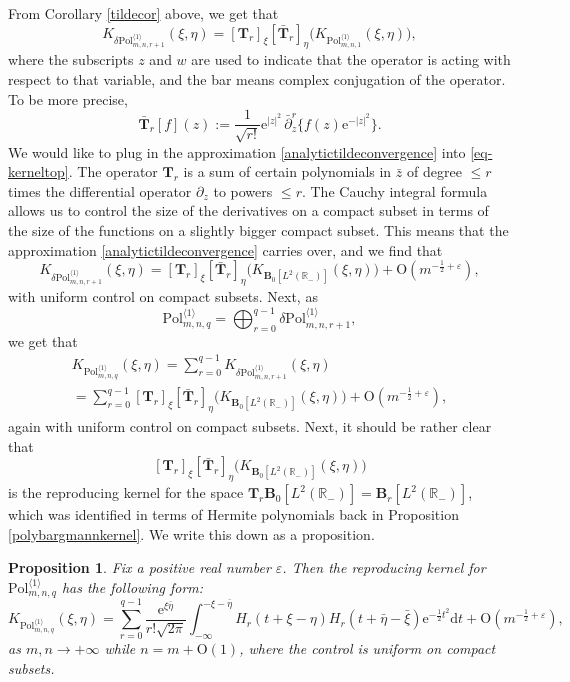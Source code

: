 \documentclass{birkart}
\newtheorem{prop}[thm]{Proposition}
\theoremstyle{definition}
\theoremstyle{remark}
\numberwithin{equation}{section}
\numberwithin{figure}{section}
\newcommand{\e}{\mathrm e}
\newcommand{\1}{{\mathbf 1}}
\newcommand{\R}{{\mathbb R}}
\newcommand{\Ordo}{\mathrm{O}}
\newcommand{\Tope}{{\mathbf T}}
\newcommand{\Bop}{{\mathbf B}}
\newcommand{\Fspace}{{\delta\mathrm{Pol}}}
\newcommand{\diff}{{\mathrm d}}
\begin{document}
From Corollary \ref{tildecor} above, we get that
\begin{equation}
\label{eq-kerneltop}
K_{\Fspace^{\langle1\rangle}_{m,n,r+1}}(\xi,\eta)=[\Tope_r]_\xi
[\bar\Tope_r]_\eta
\big(K_{\mathrm{Pol}^{\langle1\rangle}_{m,n,1}}(\xi,\eta)\big),
\end{equation}
where the subscripts $z$ and $w$ are used to indicate that the operator is
acting with respect to that variable, and the bar means complex
conjugation of the operator. To be more precise,
\[
\bar\Tope_r[f](z):=\frac{1}{\sqrt{r!}} \e^{|z|^2}\,
\bar\partial_z^r\big\{f(z)\e^{-|z|^2}\big\}.
\]
We would like to plug in the approximation \eqref{analytictildeconvergence}
into \eqref{eq-kerneltop}. The operator $\Tope_r$ is a sum of certain 
polynomials in $\bar z$ of degree $\le r$ times the differential operator 
$\partial_z$ to powers $\le r$.  
The Cauchy integral formula allows us to control the size of the derivatives 
on a compact subset in terms of the size of the functions on a slightly bigger
compact subset. This means that the approximation 
\eqref{analytictildeconvergence} carries over, and we find that
\begin{equation} 
\label{analytictildeconvergence2}
K_{\Fspace^{\langle1\rangle}_{m,n,r+1}}(\xi,\eta)= 
[\Tope_r]_\xi
[\bar\Tope_r]_\eta
\big(K_{\Bop_0[L^2(\R_-)]}(\xi,\eta)\big)+\Ordo(m^{-\frac12+\varepsilon}), 
\end{equation}
with uniform control on compact subsets. Next, as 
\[
\mathrm{Pol}^{\langle1\rangle}_{m,n,q}=\bigoplus_{r=0}^{q-1}
\Fspace^{\langle1\rangle}_{m,n,r+1},
\]
we get that
\begin{multline}
\label{analytictildeconvergence3}
K_{\mathrm{Pol}^{\langle1\rangle}_{m,n,q}}(\xi,\eta)=
\sum_{r=0}^{q-1}K_{\Fspace^{\langle1\rangle}_{m,n,r+1}}(\xi,\eta)
\\
=\sum_{r=0}^{q-1}[\Tope_r]_\xi[\bar\Tope_r]_\eta
\big(K_{\Bop_0[L^2(\R_-)]}(\xi,\eta)\big)+\Ordo(m^{-\frac12+\varepsilon}), 
\end{multline}
again with uniform control on compact subsets. Next, it should be rather clear
that
\[
[\Tope_r]_\xi[\bar\Tope_r]_\eta\big(K_{\Bop_0[L^2(\R_-)]}(\xi,\eta)\big)
\]
is the reproducing kernel for the space $\Tope_r\Bop_0[L^2(\R_-)]=\Bop_r
[L^2(\R_-)]$, which was identified in terms of Hermite polynomials back in
Proposition \ref{polybargmannkernel}.
We write this down as a proposition. 

\begin{prop}
\label{prop-5.9}
Fix a positive real number  $\varepsilon$. Then the reproducing kernel for 
$\mathrm{Pol}^{\langle1\rangle}_{m,n,q}$ has the following form:
\[
K_{\mathrm{Pol}^{\langle1\rangle}_{m,n,q}}(\xi,\eta)=
\sum_{r=0}^{q-1}\frac{\e^{\xi\bar\eta}}{r! \sqrt{2 \pi}}
\int_{-\infty}^{-\xi-\bar\eta} H_r(t+\xi-\eta)
H_r(t+\bar\eta-\bar\xi)\e^{-\frac12t^2} \diff t+
\Ordo(m^{-\frac12+\varepsilon}),
\]
as $m,n\to+\infty$ while $n=m+\Ordo(1)$, where the control is uniform on 
compact subsets. 
\end{prop}
\end{document}
